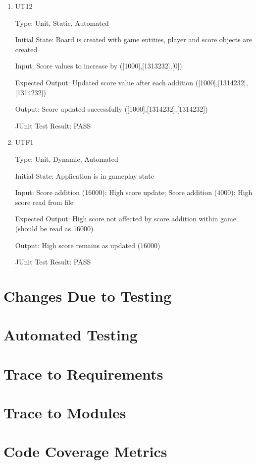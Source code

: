 \documentclass[12pt, titlepage]{article}
\begin{document}
\begin{enumerate}
\item{UT12\\}

Type: Unit, Static, Automated
					
Initial State: Board is created with game entities, player and score objects are created
					
Input: Score values to increase by ([1000],[1313232],[0])
					
Expected Output: Updated score value after each addition ([1000],[1314232],[1314232])
					
Output: Score updated successfully ([1000],[1314232],[1314232])

JUnit Test Result: PASS

\item{UTF1\\}

Type: Unit, Dynamic, Automated
					
Initial State: Application is in gameplay state
					
Input: Score addition (16000); High score update; Score addition (4000); High score read from file
					
Expected Output: High score not affected by score addition within game (should be read as 16000)
					
Output: High score remains as updated (16000)

JUnit Test Result: PASS

\end{enumerate}

\section{Changes Due to Testing}

\section{Automated Testing}
		
\section{Trace to Requirements}
		
\section{Trace to Modules}		

\section{Code Coverage Metrics}

%

%
\end{document}
